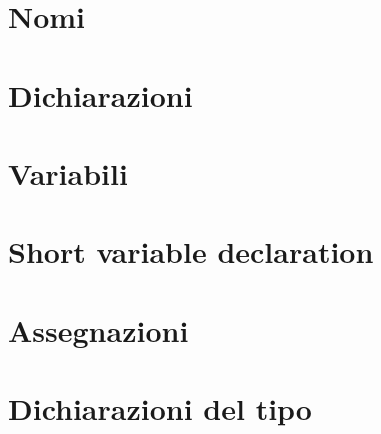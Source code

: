 %
\section{Nomi}
\label{sec:nomi}%



\section{Dichiarazioni}
\label{sec:dichiarazioni}%



\section{Variabili}
\label{sec:variabili}%



\section{Short variable declaration}
\label{sec:short_variable_declaration}


\section{Assegnazioni}
\label{sec:assegnazioni}%



\section{Dichiarazioni del tipo}
\label{sec:dichiarazioni_del_tipo}


